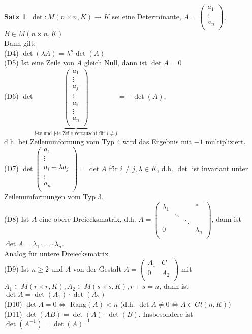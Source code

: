 \documentclass[10pt,a4paper,numbers=endperiod]{scrartcl}
\theoremstyle{definition}
\newtheorem{satz}{Satz}[section]
\begin{document}
\begin{satz}
	$\det: M(n\times n,K) \rightarrow K$ sei eine Determinante, $A= \begin{pmatrix}
	a_1\\
	\vdots\\
	a_n\\
	\end{pmatrix}$, $B \in M(n \times n,K)$\\
	Dann gilt:\\
	(D4) $\det(\lambda A) = \lambda^n \det(A)$\\
	(D5) Ist eine Zeile von $A$ gleich Null, dann ist $\det A = 0$\\
	(D6) $\det \underbrace{\begin{pmatrix}
	a_1\\
	\vdots\\
	a_j\\
	\vdots\\
	a_i\\
	\vdots\\
	a_n\\
	\end{pmatrix}}_{\text{i-te und j-te Zeile vertauscht für $i \neq j$}} = -\det(A)$,\\ d.h. bei Zeilenumformung vom Typ 4 wird das Ergebnis mit $-1$ multipliziert.\\
	(D7) $\det \begin{pmatrix}
	a_1\\
	\vdots\\
	a_i+\lambda a_j\\
	\vdots\\
	a_n\\
	\end{pmatrix}= \det A$ für $i \neq j, \lambda \in K$, d.h. $\det$ ist invariant unter Zeilenumformungen vom Typ 3.\\
	(D8) Ist $A$ eine obere Dreiecksmatrix, d.h. $A = \begin{pmatrix}
	\lambda_1&&&*\\
	&\ddots&&\\
	&&\ddots&\\
	0&&&\lambda_n\\
	\end{pmatrix}$, dann ist $\det A = \lambda_1 \cdot \ldots \cdot \lambda_n$.\\
	Analog für untere Dreiecksmatrix\\
	(D9) Ist $n \geq 2$ und $A$ von der Gestalt $A = \begin{pmatrix}
	A_1& C\\
	0&A_2\\
	\end{pmatrix}$ mit $A_1 \in M(r\times r,K), A_2 \in M(s \times s,K), r+s =n$, dann ist $\det A = \det(A_1) \cdot \det(A_2)$\\
	(D10) $\det A = 0 \Leftrightarrow$ Rang$(A) < n$ (d.h. $\det A \neq 0 \Leftrightarrow A \in Gl(n,K)$)\\
	(D11) $\det(AB) = \det(A) \cdot \det(B)$. Insbesondere ist $\det(A^{-1}) = \det(A)^{-1}$
\end{satz}
\end{document}
